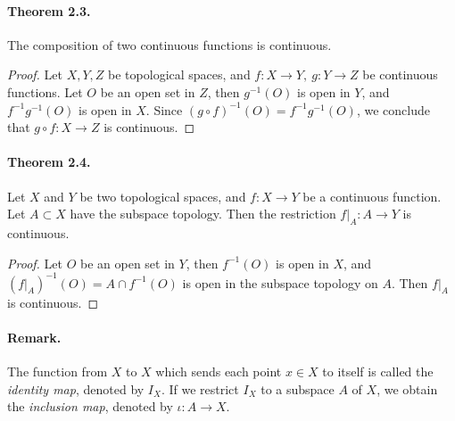 \documentclass{article}
\numberwithin{equation}{section}
\theoremstyle{plain}
\theoremstyle{definition}
\begin{document}
\paragraph{Theorem 2.3.\label{thm:2.3}} The composition of two continuous functions is continuous.
\begin{proof}
Let $X,Y,Z$ be topological spaces, and $f:X\to Y,\ g:Y\to Z$ be continuous functions. Let $O$ be an open set in $Z$, then $g^{-1}(O)$ is open in $Y$, and $f^{-1}g^{-1}(O)$ is open in $X$. Since $(g\circ f)^{-1}(O) = f^{-1}g^{-1}(O)$, we conclude that $g\circ f:X\to Z$ is continuous.
\end{proof}

\paragraph{Theorem 2.4. \label{thm:2.4}} Let $X$ and $Y$ be two topological spaces, and $f:X\to Y$ be a continuous function. Let $A\subset X$ have the subspace topology. Then the restriction $f|_A:A\to Y$ is continuous.
\begin{proof}
Let $O$ be an open set in $Y$, then $f^{-1}(O)$ is open in $X$, and $(f|_A)^{-1}(O) = A\cap f^{-1}(O)$ is open in the subspace topology on $A$. Then $f|_A$ is continuous.
\end{proof}

\paragraph{Remark.} The function from $X$ to $X$ which sends each point $x\in X$ to itself is called the \textit{identity map}, denoted by $I_X$. If we restrict $I_X$ to a subspace $A$ of $X$, we obtain the \textit{inclusion map}, denoted by $\iota:A\to X$.
\end{document}
